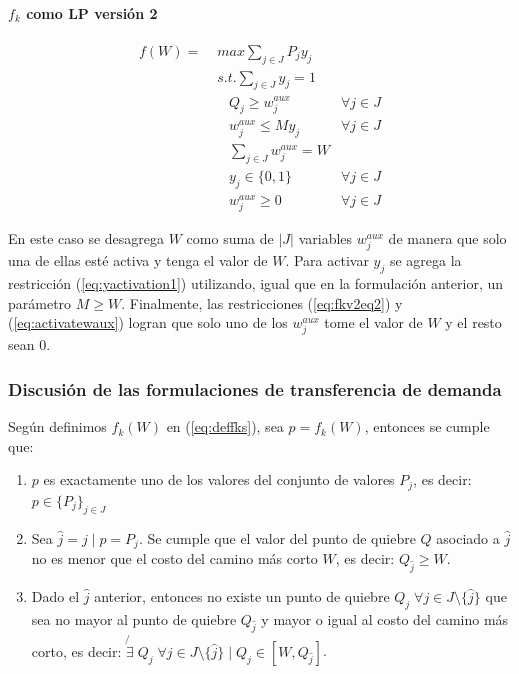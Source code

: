 \documentclass{article}
\begin{document}
  \paragraph*{$f_k$ como LP versión 2}

  \begin{align}
    f(W) =\; & max \sum_{j \in J} P_j y_j             & \label{eq:fkv2eq1}\\
             & s.t. \sum_{j \in J} y_j = 1            & \label{eq:fkv2eq2}\\
             & \;\;\; Q_j \geq w^{aux}_j              & \forall j \in J \label{eq:implfkoriginalineq} \\
             & \;\;\; w^{aux}_j \leq M y_j            & \forall j \in J \label{eq:yactivation1} \\
             & \;\;\; \sum_{j \in J} w^{aux}_j = W    & \label{eq:activatewaux} \\
             & \;\;\; y_j \in \{0,1\}                 & \label{eq:fkv2domainy} \forall j \in J\\
             & \;\;\; w^{aux}_j \geq 0                & \label{eq:fkv2eq6} \forall j \in J
  \end{align}

  En este caso se desagrega $W$ como suma de $|J|$ variables $w^{aux}_j$ de manera que solo una de ellas esté activa y tenga el valor de $W$. Para activar $y_j$ se agrega la restricción (\ref{eq:yactivation1}) utilizando, igual que en la formulación anterior, un parámetro $M \geq W$. Finalmente, las restricciones (\ref{eq:fkv2eq2}) y (\ref{eq:activatewaux}) logran que solo uno de los $w^{aux}_j$ tome el valor de $W$ y el resto sean 0.

  \subsubsection{Discusión de las formulaciones de transferencia de demanda}

  Según definimos $f_k(W)$ en (\ref{eq:deffks}), sea $p = f_k(W)$, entonces se cumple que:

  \begin{enumerate}
    \item {\label{deffpt1} $p$ es exactamente uno de los valores del conjunto de valores $P_j$, es decir: $p \in \{P_j\}_{j \in J}$}
    \item {\label{deffpt2} Sea $\hat{j} = j \;|\; p = P_j$. Se cumple que el valor del punto de quiebre $Q$ asociado a $\hat{j}$ no es menor que el costo del camino más corto $W$, es decir: $Q_{\hat{j}} \geq W$.}
    \item {\label{deffpt3} Dado el $\hat{j}$ anterior, entonces no existe un punto de quiebre $Q_j \; \forall j \in J\setminus\{\hat{j}\}$ que sea no mayor al punto de quiebre $Q_{\hat{j}}$ y mayor o igual al costo del camino más corto, es decir: $\not{\exists}\; Q_j\; \forall j \in J\setminus\{\hat{j}\} \;|\; Q_j \in  [W, Q_{\hat{j}}]$}.
  \end{enumerate}
\end{document}

